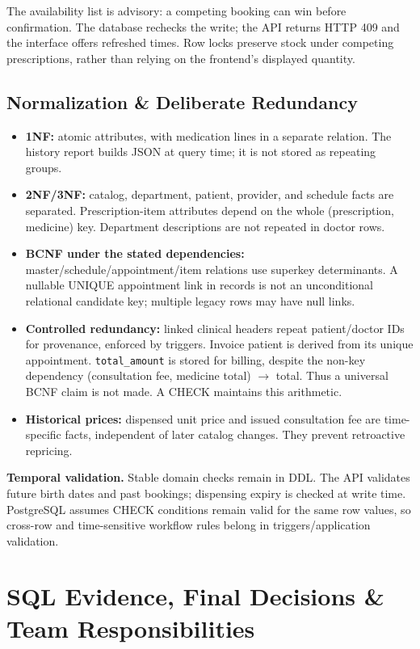 \documentclass[10pt,a4paper]{article}
\begin{document}
The availability list is advisory: a competing booking can win before confirmation. The database rechecks the write; the API returns HTTP 409 and the interface offers refreshed times. Row locks preserve stock under competing prescriptions, rather than relying on the frontend's displayed quantity.

\subsection{Normalization \& Deliberate Redundancy}
\begin{itemize}
\item \textbf{1NF:} atomic attributes, with medication lines in a separate relation. The history report builds JSON at query time; it is not stored as repeating groups.
\item \textbf{2NF/3NF:} catalog, department, patient, provider, and schedule facts are separated. Prescription-item attributes depend on the whole (prescription, medicine) key. Department descriptions are not repeated in doctor rows.
\item \textbf{BCNF under the stated dependencies:} master/schedule/appointment/item relations use superkey determinants. A nullable UNIQUE appointment link in records is not an unconditional relational candidate key; multiple legacy rows may have null links.
\item \textbf{Controlled redundancy:} linked clinical headers repeat patient/doctor IDs for provenance, enforced by triggers. Invoice patient is derived from its unique appointment. \texttt{total\_amount} is stored for billing, despite the non-key dependency (consultation fee, medicine total) $\to$ total. Thus a universal BCNF claim is not made. A CHECK maintains this arithmetic.
\item \textbf{Historical prices:} dispensed unit price and issued consultation fee are time-specific facts, independent of later catalog changes. They prevent retroactive repricing.
\end{itemize}
\textbf{Temporal validation.} Stable domain checks remain in DDL. The API validates future birth dates and past bookings; dispensing expiry is checked at write time. PostgreSQL assumes CHECK conditions remain valid for the same row values, so cross-row and time-sensitive workflow rules belong in triggers/application validation.

\newpage
\section{SQL Evidence, Final Decisions \& Team Responsibilities}
\end{document}
